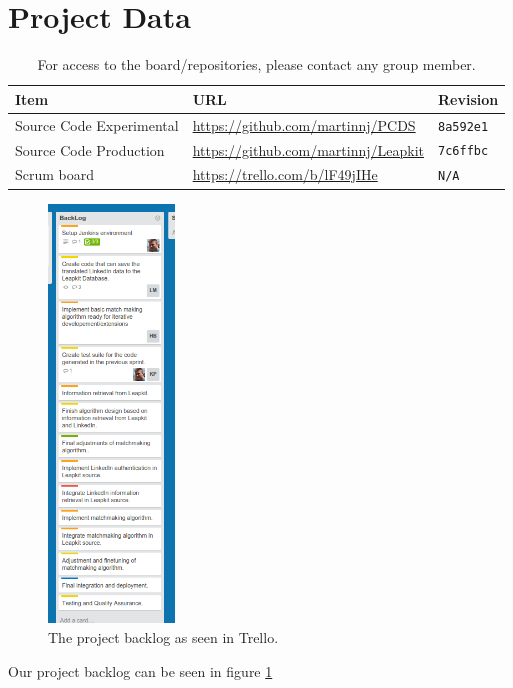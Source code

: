 \section{Project Data}

\begin{table}[h!]
    \begin{tabular}{l|l|l}
        \textbf{Item}            & \textbf{URL}                              & \textbf{Revision}\\\hline
        Source Code Experimental & \url{https://github.com/martinnj/PCDS}    & \texttt{8a592e1}\\
        Source Code Production   & \url{https://github.com/martinnj/Leapkit} & \texttt{7c6ffbc}\\
        Scrum board              & \url{https://trello.com/b/lF49jIHe}       & \texttt{N/A}
    \end{tabular}
    \label{tab:projdata}
    \caption{For access to the board/repositories, please contact any group member.}
\end{table}

\begin{figure}
  \begin{center}
   \includegraphics[width=0.3\textwidth]{backlog.png}
   \caption{The project backlog as seen in Trello.}
   \label{fig:backlog}
 \end{center}
\end{figure}

Our project backlog can be seen in figure \ref{fig:backlog}


